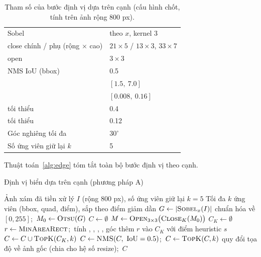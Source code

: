 \begin{table}[htbp]
\centering
\caption{Tham số của bước định vị dựa trên cạnh (cấu hình chốt, tính trên ảnh rộng 800 px).}
\label{tab:edgeparams}
\small
{}
\begin{tabularx}{\textwidth}{lY}
\hline
{}  &  \\
\hline
Sobel & theo $x$, kernel 3 \\
close chính / phụ (rộng $\times$ cao) & $21\times 5$ / $13\times 3$, $33\times 7$ \\
open & $3\times 3$ \\
NMS IoU (bbox) & 0.5 \\
 & $[1.5,\ 7.0]$ \\
 & $[0.008,\ 0.16]$ \\
 tối thiểu & 0.4 \\
 tối thiểu & 0.12 \\
Góc nghiêng tối đa & $30^\circ$ \\
Số ứng viên giữ lại $k$ & 5 \\
\hline
\end{tabularx}
\end{table}

Thuật toán~\ref{alg:edge} tóm tắt toàn bộ bước định vị theo cạnh.

\begin{algorithm}[htbp]
\caption{Định vị biển dựa trên cạnh (phương pháp A)}
\label{alg:edge}
\begin{algorithmic}[1]
\Require Ảnh xám đã tiền xử lý $I$ (rộng 800 px), số ứng viên giữ lại $k=5$
\Ensure Tối đa $k$ ứng viên (bbox, quad, điểm), sắp theo điểm giảm dần
\State $G \gets |\textsc{Sobel}_x(I)|$ chuẩn hóa về $[0,255]$;\ $M_0 \gets \textsc{Otsu}(G)$
\State $C \gets \emptyset$
    \State $M \gets \textsc{Open}_{3\times 3}\big(\textsc{Close}_K(M_0)\big)$
    \State $C_K \gets \emptyset$
        \State $r \gets \textsc{MinAreaRect}$;\ tính , , , , góc
            \State thêm $r$ vào $C_K$ với điểm heuristic $s$
        \EndIf
    \EndFor
    \State $C \gets C \cup \textsc{TopK}(C_K, k)$
\EndFor
\State $C \gets \textsc{NMS}(C,\ \text{IoU}=0.5)$;\ $C \gets \textsc{TopK}(C, k)$
\State quy đổi tọa độ về ảnh gốc (chia cho hệ số resize);\ \Return $C$
\end{algorithmic}
\end{algorithm}

